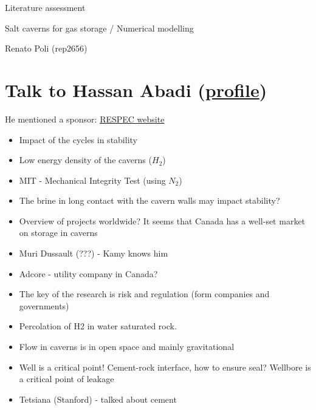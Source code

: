 \documentclass[a4paper]{article}
\begin{document}

\normalsize
 \begin{center}
Literature assessment
 \end{center}
\Large
 \begin{center}
\vspace{30pt}
Salt caverns for gas storage / Numerical modelling

\hspace{10pt}

\large
Renato Poli (rep2656) \\

\hspace{10pt}

\end{center}

\hspace{10pt}

\normalsize

\section{Talk to Hassan Abadi (\href{https://apps.ualberta.ca/directory/person/dehghanp}{profile})}

He mentioned a sponsor: \href{https://www.respec.com/market/energy/caverns-hydrogen-underground-storage/}{RESPEC website}

\begin{itemize}
\item Impact of the cycles in stability
\item Low energy density of the caverns ($H_2$)
\item MIT - Mechanical Integrity Test (using $N_2$)
\item The brine in long contact with the cavern walls may impact stability?
\item Overview of projects worldwide? It seems that Canada has a well-set market on storage in caverns
\item Muri Dussault (???) - Kamy knows him
\item Adcore - utility company in Canada?
\item The key of the research is risk and regulation (form companies and governments)
\item Percolation of H2 in water saturated rock.
\item Flow in caverns is in open space and mainly gravitational
\item Well is a critical point! Cement-rock interface, how to ensure seal? Wellbore is a critical point of leakage
\item Tetsiana (Stanford) - talked about cement
\end{itemize}
\end{document}
